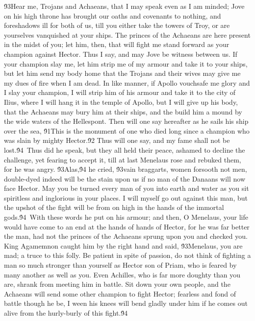 {\'93Hear me, Trojans and Achaeans, that I may speak even as I am minded; Jove on his high throne has brought our oaths and covenants to nothing, and foreshadows ill for both of us, till you either take the towers of Troy, or are yourselves vanquished at your ships. The princes of the Achaeans are here present in the midst of you; let him, then, that will fight me stand forward as your champion against Hector. Thus I say, and may Jove be witness between us. If your champion slay me, let him strip me of my armour and take it to your ships, but let him send my body home that the Trojans and their wives may give me my dues of fire when I am dead. In like manner, if Apollo vouchsafe me glory and I slay your champion, I will strip him of his armour and take it to the city of Ilius, where I will hang it in the temple of Apollo, but I will give up his body, that the Achaeans may bury him at their ships, and the build him a mound by the wide waters of the Hellespont. Then will one say hereafter as he sails his ship over the sea, \'91This is the monument of one who died long since a champion who was slain by mighty Hector.\'92 Thus will one say, and my fame shall not be lost.\'94\
Thus did he speak, but they all held their peace, ashamed to decline the challenge, yet fearing to accept it, till at last Menelaus rose and rebuked them, for he was angry. \'93Alas,\'94 he cried, \'93vain braggarts, women forsooth not men, double-dyed indeed will be the stain upon us if no man of the Danaans will now face Hector. May you be turned every man of you into earth and water as you sit spiritless and inglorious in your places. I will myself go out against this man, but the upshot of the fight will be from on high in the hands of the immortal gods.\'94\
With these words he put on his armour; and then, O Menelaus, your life would have come to an end at the hands of hands of Hector, for he was far better the man, had not the princes of the Achaeans sprung upon you and checked you. King Agamemnon caught him by the right hand and said, \'93Menelaus, you are mad; a truce to this folly. Be patient in spite of passion, do not think of fighting a man so much stronger than yourself as Hector son of Priam, who is feared by many another as well as you. Even Achilles, who is far more doughty than you are, shrank from meeting him in battle. Sit down your own people, and the Achaeans will send some other champion to fight Hector; fearless and fond of battle though he be, I ween his knees will bend gladly under him if he comes out alive from the hurly-burly of this fight.\'94\
}
